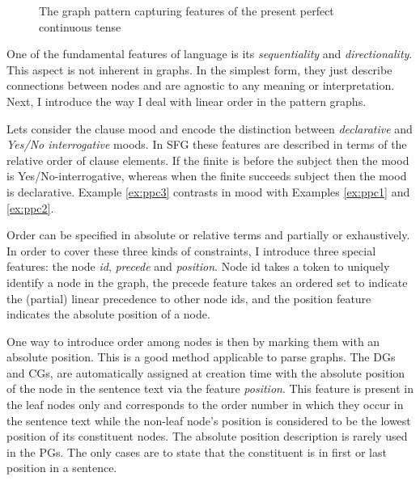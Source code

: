     \begin{figure}[!ht]
        \centering
        \caption{The graph pattern capturing features of the present perfect continuous tense}
        \label{fig:gp1}
    \end{figure}

    One of the fundamental features of language is its \textit{sequentiality} and \textit{directionality}. This aspect is not inherent in graphs. In the simplest form, they just describe connections between nodes and are agnostic to any meaning or interpretation. Next, I introduce the way I deal with linear order in the pattern graphs. 

    Lets consider the clause mood and encode the distinction between \textit{declarative} and \textit{Yes/No interrogative} moods. In SFG these features are described in terms of the relative order of clause elements. If the finite is before the subject then the mood is Yes/No-interrogative, whereas when the finite succeeds subject then the mood is declarative. Example \ref{ex:ppc3} contrasts in mood with Examples \ref{ex:ppc1} and \ref{ex:ppc2}. 

    Order can be specified in absolute or relative terms and partially or exhaustively. In order to cover these three kinds of constraints, I introduce three special features: the node \textit{id}, \textit{precede} and \textit{position}. Node id takes a token to uniquely identify a node in the graph, the precede feature takes an ordered set to indicate the (partial) linear precedence to other node ids, and the position feature indicates the absolute position of a node.

    One way to introduce order among nodes is then by marking them with an absolute position. This is a good method applicable to parse graphs. The DGs and CGs, are automatically assigned at creation time with the absolute position of the node in the sentence text via the feature \textit{position}. This feature is present in the leaf nodes only and corresponds to the order number in which they occur in the sentence text while the non-leaf node's position is considered to be the lowest position of its constituent nodes. The absolute position description is rarely used in the PGs. The only cases are to state that the constituent is in first or last position in a sentence.  %

